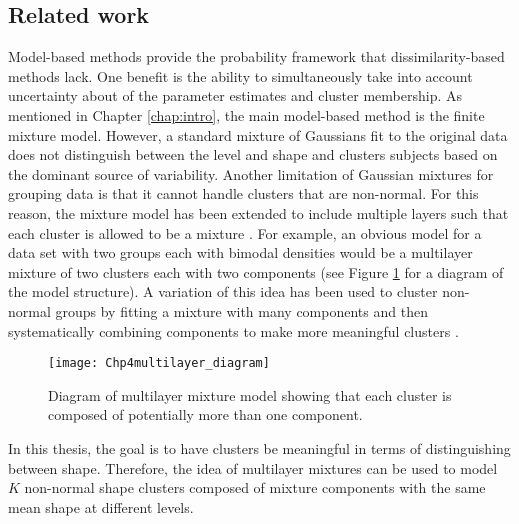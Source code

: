 \subsection{Related work}
Model-based methods provide the probability framework that dissimilarity-based methods lack. One benefit is the ability to simultaneously take into account uncertainty about of the parameter estimates and cluster membership. As mentioned in Chapter \ref{chap:intro}, the main model-based method is the finite mixture model. However, a standard mixture of Gaussians fit to the original data does not distinguish between the level and shape and clusters subjects based on the dominant source of variability. Another limitation of Gaussian mixtures for grouping data is that it cannot handle clusters that are non-normal. For this reason, the mixture model has been extended to include multiple layers such that each cluster is allowed to be a mixture \cite{li2005}.  For example, an obvious model for a data set with two groups each with bimodal densities would be a multilayer mixture of two clusters each with two components (see Figure \ref{fig:dia} for a diagram of the model structure). A variation of this idea has been used to cluster non-normal groups by fitting a mixture with many components and then systematically combining components to make more meaningful clusters \cite{hennig2010}. 
\begin{figure}[h]
\centering
\texttt{[image: Chp4multilayer\_diagram]}
\caption{Diagram of multilayer mixture model showing that each cluster is composed of potentially more than one component.}
\label{fig:dia}
\end{figure}

In this thesis, the goal is to have clusters be meaningful in terms of distinguishing between shape. Therefore, the idea of multilayer mixtures can be used to model $K$ non-normal shape clusters composed of mixture components with the same mean shape at different levels.


